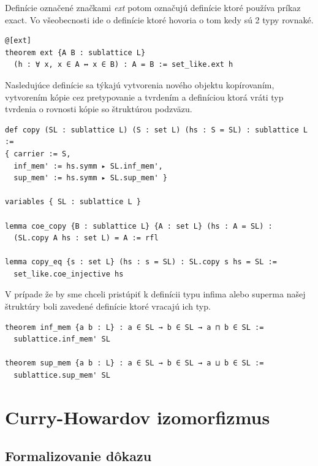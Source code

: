 \documentclass[a4paper,10pt,oneside]{report}%
\begin{document}
    Definície označené značkami \emph{ext} potom označujú definície ktoré
používa príkaz exact. Vo všeobecnosti ide o definície ktoré hovoria o tom
kedy sú 2 typy rovnaké.
\begin{lstlisting}
@[ext]
theorem ext {A B : sublattice L}
  (h : ∀ x, x ∈ A ↔ x ∈ B) : A = B := set_like.ext h
\end{lstlisting}
    Nasledujúce definície sa týkajú vytvorenia nového objektu kopírovaním,
vytvorením kópie cez pretypovanie a tvrdením a definíciou ktorá vráti typ
tvrdenia o rovnosti kópie so štruktúrou podzväzu.
\begin{lstlisting}
def copy (SL : sublattice L) (S : set L) (hs : S = SL) : sublattice L :=
{ carrier := S,
  inf_mem' := hs.symm ▸ SL.inf_mem',
  sup_mem' := hs.symm ▸ SL.sup_mem' }

variables { SL : sublattice L }

lemma coe_copy {B : sublattice L} {A : set L} (hs : A = SL) :
  (SL.copy A hs : set L) = A := rfl

lemma copy_eq {s : set L} (hs : s = SL) : SL.copy s hs = SL :=
  set_like.coe_injective hs
\end{lstlisting}
    V prípade že by sme chceli pristúpiť k definícii typu infima alebo superma
našej štruktúry boli zavedené definície ktoré vracajú ich typ.
\begin{lstlisting}
theorem inf_mem {a b : L} : a ∈ SL → b ∈ SL → a ⊓ b ∈ SL :=
  sublattice.inf_mem' SL

theorem sup_mem {a b : L} : a ∈ SL → b ∈ SL → a ⊔ b ∈ SL :=
  sublattice.sup_mem' SL
\end{lstlisting}

\chapter{Curry-Howardov izomorfizmus}
\section{Formalizovanie dôkazu}
\end{document}
